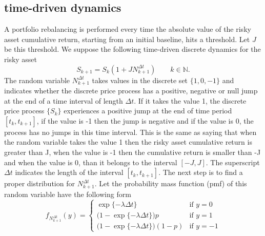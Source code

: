 \subsection{time-driven dynamics}
A portfolio rebalancing is performed every time the absolute value of the risky asset cumulative return, starting from an initial baseline, hits a threshold. Let $J$ be this threshold. We suppose the following time-driven discrete dynamics for the risky asset
\begin{equation}\label{eq:time_driven_dynamics}
S_{k+1} = S_k(1 + J N^{\Delta t}_{k+1}) \qquad k \in \mathbb{N}.
\end{equation}
The random variable $N^{\Delta t}_{k+1}$ takes values in the discrete set $\{1,0,-1\}$ and indicates whether the discrete price process has a positive, negative or null jump at the end of a time interval of length $\Delta t$. If it takes the value 1, the discrete price process $\{S_k\}$ experiences a positive jump at the end of time period $[t_k,t_{k+1}]$, if the value is -1 then the jump is negative and if the value is 0, the process has no jumps in this time interval. This is the same as saying that when the random variable takes the value 1 then the risky asset cumulative return is greater than J, when the value is -1 then the cumulative return is smaller than -J and when the value is 0, than it belongs to the interval $[-J,J]$. The superscript $\Delta t$ indicates the length of the interval $[t_k,t_{k+1}]$. The next step is to find a proper distribution for $N^{\Delta t}_{k+1}$.
%	
%		
%			
Let the probability mass function (pmf) of this random variable  have the following form
\begin{equation}\label{eq:pmf_time_driven}
f_{N^{\Delta t}_{k+1}}(y) = 
\begin{cases}
 \exp\{-\lambda \Delta t\} & \text{if } y = 0 \\
 \big(1-\exp\{-\lambda \Delta t\}\big)p & \text{if } y = 1 \\
 \big(1-\exp\{-\lambda \Delta t\}\big)(1-p) & \text{if } y = -1
\end{cases}
\end{equation}
